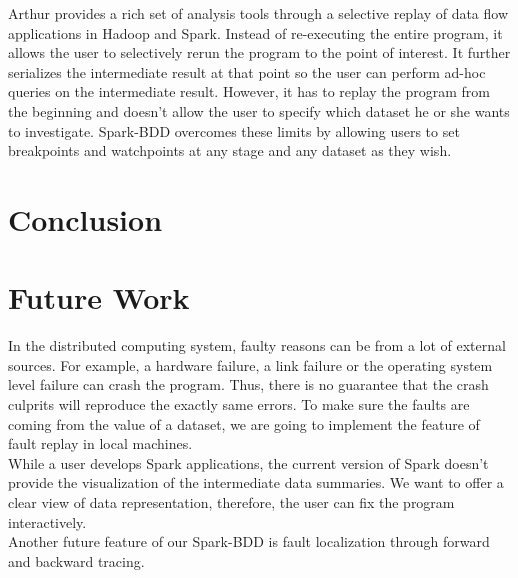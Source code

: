 \documentclass{acm_proc_article-sp}
\begin{document}
Arthur provides a rich set of analysis tools through a selective replay of data flow applications in Hadoop and Spark. Instead of re-executing the entire program, it allows the user to selectively rerun the program to the point of interest. It further serializes the intermediate result at that point so the user can perform ad-hoc queries on the intermediate result. However, it has to replay the program from the beginning and doesn't allow the user to specify which dataset he or she wants to investigate. Spark-BDD overcomes these limits by allowing users to set breakpoints and watchpoints at any stage and any dataset as they wish.

\section{Conclusion}

\section{Future Work}
In the distributed computing system, faulty reasons can be from a lot of external sources. For example, a hardware failure, a link failure or the operating system level failure can crash the program. Thus, there is no guarantee that the crash culprits will reproduce the exactly same errors. To make sure the faults are coming from the value of a dataset, we are going to implement the feature of fault replay in local machines.\\
While a user develops Spark applications, the current version of Spark doesn't provide the visualization of the intermediate data summaries. We want to offer a clear view of data representation, therefore, the user can fix the program interactively.\\
Another future feature of our Spark-BDD is fault localization through forward and backward tracing.


  
\balancecolumns
\end{document}
